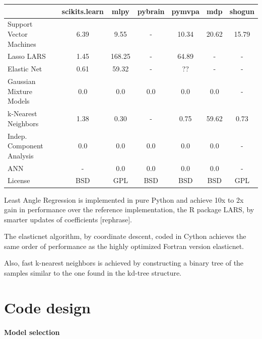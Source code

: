 \documentclass[twoside,11pt]{article}
\begin{document}
\begin{center}


\begin{tabular}{l c c c c c c}
\hline\hline %
 & scikits.learn & mlpy & pybrain & pymvpa &  mdp & shogun \\ [0.5ex]
\hline
Support Vector Machines & 6.39 & 9.55 & - & 10.34 & 20.62 & 15.79 \\
Lasso LARS & 1.45 & 168.25   & -       &  64.89     & -    & - \\
Elastic Net & 0.61 & 59.32 & -  &  ??  & -  & - \\
Gaussian Mixture Models  & 0.0 & 0.0   & 0.0       &  0.0     & 0.0    & - \\
k-Nearest Neighbors & 1.38 & 0.30  & - &  0.75 & 59.62    & 0.73 \\
Indep. Component Analysis & 0.0 & 0.0  & 0.0  & 0.0  & 0.0  & - \\
ANN  & - & 0.0  & 0.0  & 0.0  & 0.0  & - \\
License &  BSD & GPL & BSD  &  BSD  & BSD  & GPL \\
\hline
\end{tabular}

\end{center}



Least Angle Regression is implemented in pure Python and achieve 10x
to 2x gain in performance over the reference implementation, the R
package LARS, by smarter updates of coefficients [rephrase].


The elasticnet algorithm, by coordinate descent, coded in Cython
achieves the same order of performance as the highly optimized Fortran
version elasticnet.

Also, fast k-nearest neighbors is achieved by constructing a binary
tree of the samples similar to the one found in the kd-tree structure.


\section{Code design}



\paragraph {Model selection}
\end{document}
